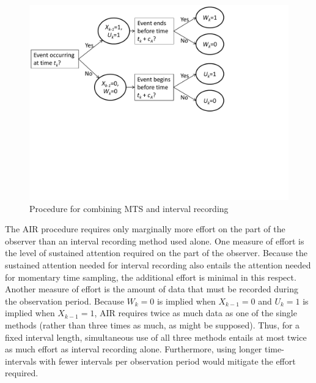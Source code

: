 \documentclass[man, noextraspace, floatsintext]{apa6}\usepackage[]{graphicx}\usepackage[]{color}
\begin{document}
\begin{figure}[hbtp]
\centering
\includegraphics[clip=true, trim= 0 240 150 00, width=0.8\linewidth]{AIR_flowchart.pdf}
\caption{Procedure for combining MTS and interval recording}
\label{fig:questions}
\end{figure}  

The AIR procedure requires only marginally more effort on the part of the observer than an interval recording method used alone. 
One measure of effort is the level of sustained attention required on the part of the observer. Because the sustained attention needed for interval recording also entails the attention needed for momentary time sampling, the additional effort is minimal in this respect.
Another measure of effort is the amount of data that must be recorded during the observation period. Because $W_k = 0$ is implied when $X_{k-1} = 0$ and $U_k = 1$ is implied when $X_{k-1} = 1$, AIR requires twice as much data as one of the single methods (rather than three times as much, as might be supposed). 
Thus, for a fixed interval length, simultaneous use of all three methods entails at most twice as much effort as interval recording alone. 
Furthermore, using longer time-intervals with fewer intervals per observation period would mitigate the effort required. 
\end{document}
